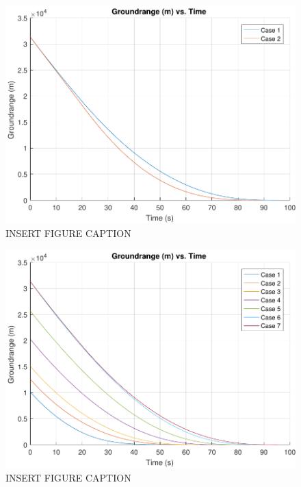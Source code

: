 \begin{figure}[H]
	\centering
	\begin{minipage}{4.5 in}
		\includegraphics[width=\linewidth]{Figures/rngatmovsvac.pdf}
		\caption{INSERT FIGURE CAPTION \label{fig:rngatmovsvac} }
	\end{minipage}
\end{figure}



\begin{figure}[H]
	\centering
	\begin{minipage}{4.5 in}
		\includegraphics[width=\linewidth]{Figures/rngpowatmo.pdf}
		\caption{INSERT FIGURE CAPTION \label{fig:rngpowatmo} }
	\end{minipage}
\end{figure}



